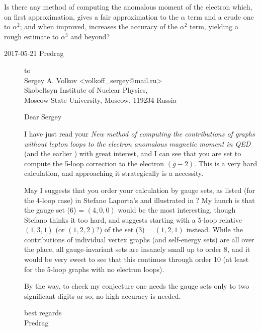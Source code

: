 
\begin{bartlett}{
Is there any method of computing the anomalous moment of the
electron which, on first approximation, gives a fair approximation to the
$\alpha$ term and a crude one to $\alpha^2$; and when improved, increases
the accuracy of the $\alpha^2$ term, yielding a rough estimate to
$\alpha^3$ and beyond?
        }
\end{bartlett}



\begin{description}

\item[2017-05-21 Predrag] to
\\
Sergey  A. Volkov <volkoff\_sergey@mail.ru>
\\
Skobeltsyn Institute of Nuclear Physics,
\\
Moscow State University, Moscow, 119234 Russia

Dear Sergey

I have just read your
{\em New method of computing the contributions of graphs without lepton
loops to the electron anomalous magnetic moment in {QED}}
(and the earlier ) with great interest, and I can see
that you are set to compute the 5-loop correction to the electron
$(g-2)$. This is a very hard calculation, and approaching it
strategically is a necessity.

May I suggests that you order your calculation by gauge sets,
as listed (for the 4-loop case) in Stefano Laporta's
 and illustrated in
? My hunch is that the gauge set (6) = $(4,0,0)$ would be
the most interesting, though Stefano thinks it too hard, and suggests
starting with a 5-loop relative $(1,3,1)$ (or $(1,2,2)$?)
of the set (3) = $(1,2,1)$ instead. While the
contributions of individual vertex graphs (and self-energy sets)
are all over the place, all gauge-invariant sets are insanely small up to
order 8, and it would be very sweet to see that this continues through
order 10 (at least for the 5-loop graphs with no electron loops).

By the way, to check my conjecture one needs the gauge sets only to two
significant digits or so, no high accuracy is needed.

best regards
\\
Predrag


\end{description}

